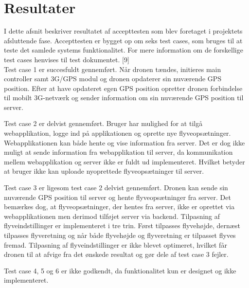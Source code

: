 \section{Resultater}

I dette afsnit beskriver resultatet af accepttesten som blev foretaget i projektets afsluttende fase. 
Accepttesten er bygget op om seks test cases, som bruges til at teste det samlede systems funktionalitet. For mere information om de forskellige test cases henvises til test dokumentet. [9] \\

Test case 1 er succesfuldt gennemført. Når dronen tændes, initieres main controller samt 3G/GPS modul og dronen opdaterer sin nuværende GPS position. Efter at have opdateret egen GPS position opretter dronen forbindelse til mobilt 3G-netværk og sender information om sin nuværende GPS position til server.

Test case 2 er delvist gennemført. Bruger har mulighed for at tilgå webapplikation, logge ind på applikationen og oprette nye flyveopsætninger. Webapplikationen kan både hente og vise information fra server. Det er dog ikke muligt at sende information fra webapplikation til server, da kommunikation mellem webapplikation og server ikke er fuldt ud implementeret. Hvilket betyder at bruger ikke kan uploade nyoprettede flyveopsætninger til server.  

Test case 3 er ligesom test case 2 delvist gennemført. Dronen kan sende sin nuværende GPS position til server og hente flyveopsætninger fra server. Det bemærkes dog, at flyveopsætninger, der hentes fra server, ikke er oprettet via webapplikationen men derimod tilføjet server via backend. 
Tilpasning af flyveindstillinger er implementeret i tre trin. Først tilpasses flyvehøjde, dernæst tilpasses flyveretning og når både flyvehøjde og flyveretning er tilpasset flyves fremad.
Tilpasning af flyveindstillinger er ikke blevet optimeret, hvilket får dronen til at afvige fra det ønskede resultat og gør dele af test case 3 fejler.

Test case 4, 5 og 6 er ikke godkendt, da funktionalitet kun er designet og ikke implementeret.
